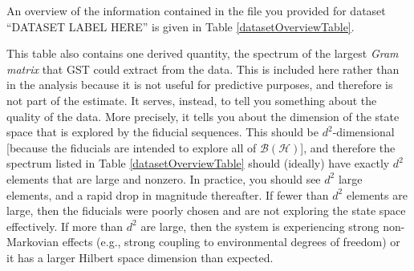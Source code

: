 \documentclass{article}[11pt]
\newcommand{\putfield}[2]{#2}
\begin{document}
\iftoggle{LsAndGermsSet}{ The fiducial sequences and germs for \emph{this} dataset are given in Tables \ref{fiducialListTable} and \ref{germListTable}. }{ Fiducial sequence and germ information was not given for this report, and may not be applicable.}  An overview of the information contained in the file you provided for dataset ``\putfield{datasetLabel}{DATASET LABEL HERE}'' is given in Table \ref{datasetOverviewTable}.  

This table also contains one derived quantity, the spectrum of the largest \emph{Gram matrix} that GST could extract from the data.  This is included here rather than in the analysis because it is not useful for predictive purposes, and therefore is not part of the estimate.  It serves, instead, to tell you something about the quality of the data.  More precisely, it tells you about the dimension of the state space that is explored by the fiducial sequences.  This should be $d^2$-dimensional [because the fiducials are intended to explore all of $\mathcal{B}(\mathcal{H})$], and therefore the spectrum listed in Table \ref{datasetOverviewTable} should (ideally) have exactly $d^2$ elements that are large and nonzero.  In practice, you should see $d^2$ large elements, and a rapid drop in magnitude thereafter.  If fewer than $d^2$ elements are large, then the fiducials were poorly chosen and are not exploring the state space effectively.  If more than $d^2$ are large, then the system is experiencing strong non-Markovian effects (e.g., strong coupling to environmental degrees of freedom) or it has a larger Hilbert space dimension than expected.

\iftoggle{LsAndGermsSet}{

\begin{table}[h]
\begin{center}
\putfield{fiducialListTable}{List of fiducials table will be placed here}
\caption{\putfield{tt_fiducialListTable}{}\textbf{Fiducial sequences.}  A list of the preparation and measurement ``fiducial'' gate sequences. See discussion in text.\label{fiducialListTable}}
\end{center}
\end{table}

\begin{table}[h]
\begin{center}
\small
\putfield{germList2ColTable}{List of germs table will be placed here}
\caption{\putfield{tt_germList2ColTable}{}\textbf{Germ sequences.}  A list of the ``germ'' gate sequences.  See discussion in text.\label{germListTable}}
\end{center}
\end{table}

}{}
\end{document}
